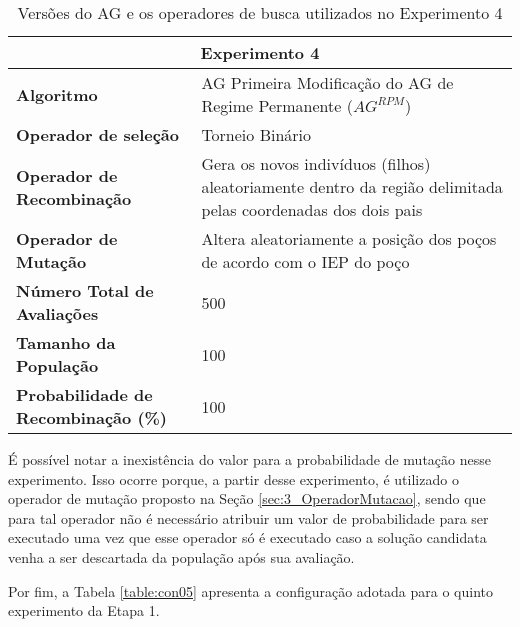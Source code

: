 \begin{table}[!htbp]
\centering
\caption{Versões do AG e os operadores de busca utilizados no Experimento 4}
\label{table:con04}
\begin{tabular}{|p{6cm}|p{9cm}|}
\hline
 
 \multicolumn{2}{|c|}{\textbf{Experimento 4}} \\ \hline
\textbf{Algoritmo} & AG Primeira Modificação do AG de Regime Permanente ($AG^{RPM}$) \\ \hline
\textbf{Operador de seleção} & Torneio Binário \\ \hline
\textbf{Operador de Recombinação} & Gera os novos indivíduos (filhos) aleatoriamente dentro da região delimitada pelas coordenadas dos dois pais \\  \hline
\textbf{Operador de Mutação} & Altera aleatoriamente a posição dos poços de acordo com o IEP do poço \\ \hline
\textbf{Número Total de Avaliações} & 500 \\ \hline
\textbf{Tamanho da População} & 100 \\ \hline
\textbf{Probabilidade de Recombinação (\%)} & 100 \\ \hline
\end{tabular}
\end{table}

É possível notar a inexistência do valor para a probabilidade de mutação nesse experimento. Isso ocorre porque, a partir desse experimento, é utilizado o operador de mutação proposto na Seção \ref{sec:3_OperadorMutacao}, sendo que para tal operador não é necessário atribuir um valor de probabilidade para ser executado uma vez que esse operador só é executado caso a solução candidata venha a ser descartada da população após sua avaliação.

Por fim, a Tabela \ref{table:con05} apresenta a configuração adotada para o quinto experimento da Etapa 1. 

